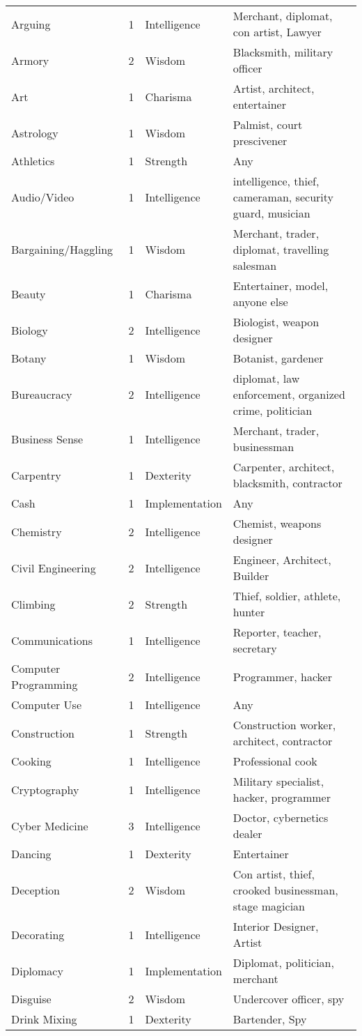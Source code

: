 \documentclass[twoside]{book}
\begin{document}
\begin{longtable}{p{1.25in}llp{12em}}
      \raggedright Arguing&1&Intelligence&Merchant, diplomat, con artist, Lawyer\tabularnewline
      \raggedright Armory&2&Wisdom&Blacksmith, military officer\tabularnewline
      \raggedright Art&1&Charisma&Artist, architect, entertainer\tabularnewline
      \raggedright Astrology&1&Wisdom&Palmist, court prescivener\tabularnewline
      \raggedright Athletics&1&Strength&Any\tabularnewline
      \raggedright Audio/Video&1&Intelligence&intelligence, thief, cameraman, security guard, musician\tabularnewline
      \raggedright Bargaining/Haggling&1&Wisdom&Merchant, trader, diplomat, travelling salesman\tabularnewline
      \raggedright Beauty&1&Charisma&Entertainer, model, anyone else\tabularnewline
      \raggedright Biology&2&Intelligence&Biologist, weapon designer\tabularnewline
      \raggedright Botany&1&Wisdom&Botanist, gardener\tabularnewline
      \raggedright Bureaucracy&2&Intelligence&diplomat, law enforcement, organized crime, politician\tabularnewline
      \raggedright Business Sense&1&Intelligence&Merchant, trader, businessman\tabularnewline
      \raggedright Carpentry&1&Dexterity&Carpenter, architect, blacksmith, contractor\tabularnewline
      \raggedright Cash&1&Implementation&Any\tabularnewline
      \raggedright Chemistry&2&Intelligence&Chemist, weapons designer\tabularnewline
      \raggedright Civil Engineering&2&Intelligence&Engineer, Architect, Builder\tabularnewline
      \raggedright Climbing&2&Strength&Thief, soldier, athlete, hunter\tabularnewline
      \raggedright Communications&1&Intelligence&Reporter, teacher, secretary\tabularnewline
      \raggedright Computer Programming&2&Intelligence&Programmer, hacker\tabularnewline
      \raggedright Computer Use&1&Intelligence&Any\tabularnewline
      \raggedright Construction&1&Strength&Construction worker, architect, contractor\tabularnewline
      \raggedright Cooking&1&Intelligence&Professional cook\tabularnewline
      \raggedright Cryptography&1&Intelligence&Military specialist, hacker, programmer\tabularnewline
      \raggedright Cyber Medicine&3&Intelligence&Doctor, cybernetics dealer\tabularnewline
      \raggedright Dancing&1&Dexterity&Entertainer\tabularnewline
      \raggedright Deception&2&Wisdom&Con artist, thief, crooked businessman, stage magician\tabularnewline
      \raggedright Decorating&1&Intelligence&Interior Designer, Artist\tabularnewline
      \raggedright Diplomacy&1&Implementation&Diplomat, politician, merchant\tabularnewline
      \raggedright Disguise&2&Wisdom&Undercover officer, spy\tabularnewline
      \raggedright Drink Mixing&1&Dexterity&Bartender, Spy\tabularnewline

\end{longtable}
\end{document}
